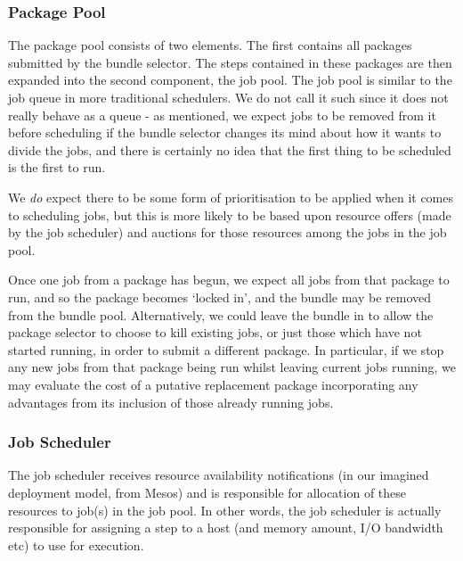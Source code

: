 \documentclass[10pt,a4paper]{article}
\newcommand{\npar}{\par\noindent\space}
\begin{document}
\subsubsection{Package Pool}
\npar The package pool consists of two elements. The first contains all packages submitted by the bundle selector. The steps contained in these packages are then expanded into the second component, the job pool. The job pool is similar to the job queue in more traditional schedulers. We do not call it such since it does not really behave as a queue - as mentioned, we expect jobs to be removed from it before scheduling if the bundle selector changes its mind about how it wants to divide the jobs, and there is certainly no idea that the first thing to be scheduled is the first to run.
\npar We \textit{do} expect there to be some form of prioritisation to be applied when it comes to scheduling jobs, but this is more likely to be based upon resource offers (made by the job scheduler) and auctions for those resources among the jobs in the job pool.
\npar Once one job from a package has begun, we expect all jobs from that package to run, and so the package becomes `locked in', and the bundle may be removed from the bundle pool. Alternatively, we could leave the bundle in to allow the package selector to choose to kill existing jobs, or just those which have not started running, in order to submit a different package. In particular, if we stop any new jobs from that package being run whilst leaving current jobs running, we may evaluate the cost of a putative replacement package incorporating any advantages from its inclusion of those already running jobs.

\subsubsection{Job Scheduler}
\npar The job scheduler receives resource availability notifications (in our imagined deployment model, from Mesos) and is responsible for allocation of these resources to job(s) in the job pool. In other words, the job scheduler is actually responsible for assigning a step to a host (and memory amount, I/O bandwidth etc) to use for execution.
\end{document}
